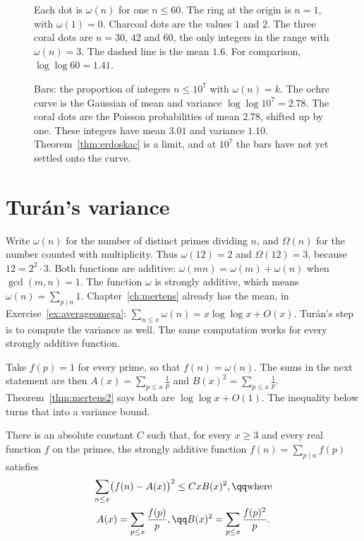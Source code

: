 \begin{figure}[ht]
\centering
{}
\caption{Each dot is $\omega(n)$ for one $n\le 60$. The ring at the origin is $n=1$, with $\omega(1)=0$. Charcoal dots are the values $1$ and $2$. The three coral dots are $n=30$, $42$ and $60$, the only integers in the range with $\omega(n)=3$. The dashed line is the mean $1.6$. For comparison, $\log\log 60=1.41$.}
\label{fig:omega60}
\end{figure}

\begin{figure}[ht]
\centering
{}
\caption{Bars: the proportion of integers $n\le10^7$ with $\omega(n)=k$. The ochre curve is the Gaussian of mean and variance $\log\log10^7=2.78$. The coral dots are the Poisson probabilities of mean $2.78$, shifted up by one. These integers have mean $3.01$ and variance $1.10$. Theorem~\ref{thm:erdoskac} is a limit, and at $10^7$ the bars have not yet settled onto the curve.}
\label{fig:omega}
\end{figure}

\section{Turán's variance}

Write $\omega(n)$ for the number of distinct primes dividing $n$, and $\Omega(n)$ for the number counted with multiplicity. Thus $\omega(12)=2$ and $\Omega(12)=3$, because $12=2^2\cdot 3$. Both functions are additive: $\omega(mn)=\omega(m)+\omega(n)$ when $\gcd(m,n)=1$. The function $\omega$ is strongly additive, which means $\omega(n)=\sum_{p\mid n}1$. Chapter~\ref{ch:mertens} already has the mean, in Exercise~\ref{ex:averageomega}: $\sum_{n\le x}\omega(n)=x\log\log x+O(x)$. Turán's step is to compute the variance as well. The same computation works for every strongly additive function.

Take $f(p)=1$ for every prime, so that $f(n)=\omega(n)$. The sums in the next statement are then $A(x)=\sum_{p\le x}\frac1p$ and $B(x)^2=\sum_{p\le x}\frac1p$. Theorem~\ref{thm:mertens2} says both are $\log\log x+O(1)$. The inequality below turns that into a variance bound.

\begin{theorem}\label{thm:tk}
There is an absolute constant $C$ such that, for every $x\ge3$ and every real function $f$ on the primes, the strongly additive function $f(n)=\sum_{p\mid n}f(p)$ satisfies
\[
\begin{gathered}\sum_{n\le x}\bigl(f(n)-A(x)\bigr)^2\le CxB(x)^2,\qq\text{where}\\A(x)=\sum_{p\le x}\frac{f(p)}p,\qq B(x)^2=\sum_{p\le x}\frac{f(p)^2}p.\end{gathered}
\]
\end{theorem}

